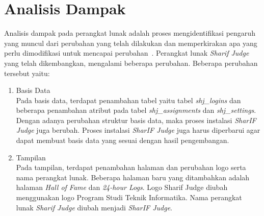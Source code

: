 \section{Analisis Dampak}
Analisis dampak pada perangkat lunak adalah proses mengidentifikasi pengaruh yang muncul dari perubahan yang telah dilakukan dan memperkirakan apa yang perlu dimodifikasi untuk mencapai perubahan~\cite{arnold:96:impact}. Perangkat lunak \textit{Sharif Judge} yang telah dikembangkan, mengalami beberapa perubahan. Beberapa perubahan tersebut yaitu:
\begin{enumerate}
	\item Basis Data \\
	Pada basis data, terdapat penambahan tabel yaitu tabel \textit{shj\_logins} dan beberapa penambahan atribut pada tabel \textit{shj\_assignments} dan \textit{shj\_settings}. Dengan adanya perubahan struktur basis data, maka proses instalasi \textit{SharIF Judge} juga berubah. Proses instalasi \textit{SharIF Judge} juga harus diperbarui agar dapat membuat basis data yang sesuai dengan hasil pengembangan.
	
	\item Tampilan \\
	Pada tampilan, terdapat penambahan halaman dan perubahan logo serta nama perangkat lunak. Beberapa halaman baru yang ditambahkan adalah halaman \textit{Hall of Fame} dan \textit{24-hour Logs}. Logo Sharif Judge diubah menggunakan logo Program Studi Teknik Informatika. Nama perangkat lunak \textit{Sharif Judge} diubah menjadi \textit{SharIF Judge}.
\end{enumerate}

